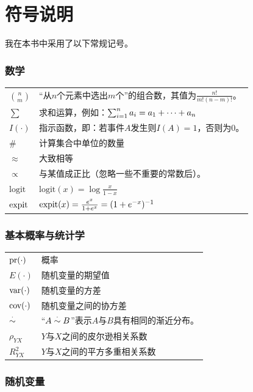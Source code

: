 \chapter*{符号说明}


我在本书中采用了以下常规记号。


\subsection*{数学}

\begin{tabular}{ll}
\hline 
$\binom{n}{m}$ & “从$n$个元素中选出$m$个”的组合数，其值为$\frac{n!}{m!(n-m)!}$。 \\
$\sum$ & 求和运算，例如：$\sum_{i=1}^n a_i = a_1 + \cdots + a_n$ \\
$I(\cdot)$ & 指示函数，即：若事件$A$发生则$I(A)=1$，否则为0。\\
$\#$ & 计算集合中单位的数量\\
$\approx$ & 大致相等 \\
$\propto$ & 与某值成正比（忽略一些不重要的常数后）。 \\
$\text{logit}$ &  $\text{logit}(x) = \log \frac{x}{1-x}$ \\
$\textup{expit}$ & $\textup{expit}(x) =   \frac{e^x}{1+e^x} =  (1 + e^{-x})^{-1}$ \\
\hline 
\end{tabular}

\subsection*{基本概率与统计学}

\begin{tabular}{ll}
\hline 
$\textup{pr}(\cdot)$ & 概率 \\
$E(\cdot)$ & 随机变量的期望值\\
$\textup{var}(\cdot)$ & 随机变量的方差 \\
$\textup{cov}(\cdot)$ & 随机变量之间的协方差\\
$\stackrel{\cdot}{\sim}$ & “$A \stackrel{\cdot}{\sim} B$”表示$A$与$B$具有相同的渐近分布。\\
$\rho_{YX}$ & $Y$与$X$之间的皮尔逊相关系数 \\
$R^2_{YX}$ & $Y$与$X$之间的平方多重相关系数 \\
\hline 
\end{tabular}


\subsection*{随机变量}

